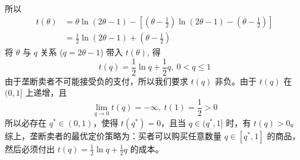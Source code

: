 \documentclass[UTF8]{article} %
\begin{document}
\begin{enumerate}
\begin{align*}
    \end{align*}
    所以
    \begin{align*}
        t(\theta) &= \theta\ln(2\theta-1) - \left[ \left(\theta-\frac{1}{2}\right)\ln(2\theta-1) - \left(\theta-\frac{1}{2}\right) \right] \\
        &= \frac{1}{2}\ln(2\theta-1) + \left(\theta-\frac{1}{2}\right)
    \end{align*}
    将 $\theta$ 与 $q$ 关系 ($q=2\theta-1$) 带入 $t(\theta)$, 得
    \[ t(q) = \frac{1}{2}\ln q + \frac{1}{2}q,\ 0 < q \leq 1 \]
    由于垄断卖者不可能接受负的支付，所以我们要求 $t(q)$ 非负。由于 $t(q)$ 在 $(0,1]$ 上递增，且
    \[ \lim_{q\to 0} t(q) = -\infty,\ t(1)=\frac{1}{2} > 0 \]
    所以必存在 $q^* \in (0,1)$，使得 $t(q^*) = 0$，且当 $q\in (q^*,1]$ 时，有 $t(q)>0$。综上，垄断卖者的最优定价策略为：买者可以购买任意数量 $q\in [q^*,1]$ 的商品，然后必须付出 $t(q)=\frac{1}{2}\ln q + \frac{1}{2}q$ 的成本。
\end{enumerate}
\end{document}
